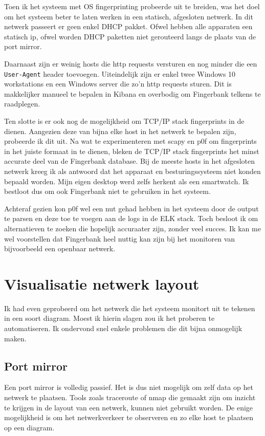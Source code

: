 \documentclass[a4paper,12pt]{report}
\begin{document}
Toen ik het systeem met OS fingerprinting probeerde uit te breiden, was het doel om het systeem beter te laten werken in een statisch, afgesloten netwerk.
In dit netwerk passeert er geen enkel DHCP pakket.
Ofwel hebben alle apparaten een statisch ip, ofwel worden DHCP paketten niet gerouteerd langs de plaats van de port mirror.

Daarnaast zijn er weinig hosts die http requests versturen en nog minder die een \lstinline|User-Agent| header toevoegen.
Uiteindelijk zijn er enkel twee Windows 10 workstations en een Windows server die zo'n http requests sturen.
Dit is makkelijker manueel te bepalen in Kibana en overbodig om Fingerbank telkens te raadplegen.

Ten slotte is er ook nog de mogelijkheid om TCP/IP stack fingerprints in de dienen.
Aangezien deze van bijna elke host in het netwerk te bepalen zijn, probeerde ik dit uit.
Na wat te experimenteren met scapy en p0f om fingerprints in het juiste formaat in te dienen, bleken de TCP/IP stack fingerprints het minst accurate deel van de Fingerbank database.
Bij de meeste hosts in het afgesloten netwerk kreeg ik als antwoord dat het apparaat en besturingssysteem niet konden bepaald worden.
Mijn eigen desktop werd zelfs herkent als een smartwatch.
Ik bestloot dus om ook Fingerbank niet te gebruiken in het systeem.

Achteraf gezien kon p0f wel een nut gehad hebben in het systeem door de output te parsen en deze toe te voegen aan de logs in de ELK stack.
Toch besloot ik om alternatieven te zoeken die hopelijk accuraater zijn, zonder veel succes.
Ik kan me wel voorstellen dat Fingerbank heel nuttig kan zijn bij het monitoren van bijvoorbeeld een openbaar netwerk.

\section{Visualisatie netwerk layout}
Ik had even geprobeerd om het netwerk die het systeem monitort uit te tekenen in een soort diagram.
Moest ik hierin slagen zou ik het proberen te automatiseren.
Ik ondervond snel enkele problemen die dit bijna onmogelijk maken.

\subsection{Port mirror}
Een port mirror is volledig passief.
Het is dus niet mogelijk om zelf data op het netwerk te plaatsen.
Tools zoals traceroute of nmap die gemaakt zijn om inzicht te krijgen in de layout van een netwerk, kunnen niet gebruikt worden.
De enige mogelijkheid is om het netwerkverkeer te observeren en zo elke host te plaatsen op een diagram.
\end{document}
